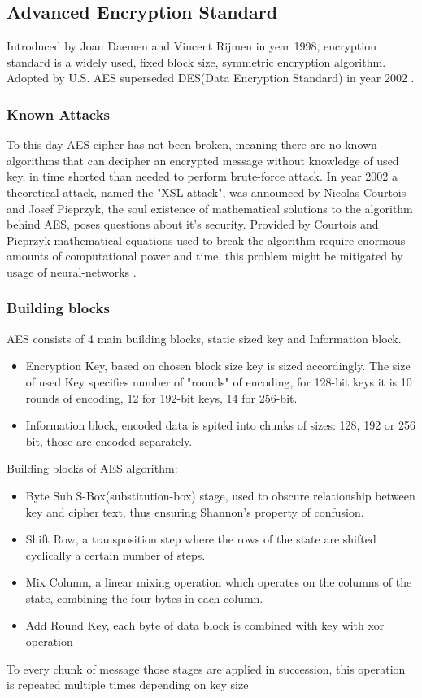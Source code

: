 \documentclass{article}
\begin{document}
\subsection{Advanced Encryption Standard}

Introduced by Joan Daemen and Vincent Rijmen in year 1998, encryption standard is a widely used, fixed block size, symmetric encryption algorithm. Adopted by U.S. AES superseded DES(Data Encryption Standard) in year 2002 \cite{Cryptanalysis of Block Ciphers}.

\subsubsection{Known Attacks}
To this day AES cipher has not been broken, meaning there are no known algorithms that can decipher an encrypted message without knowledge of used key, in time shorted than needed to perform brute-force attack.
In year 2002 a theoretical attack, named the "XSL attack", was announced by Nicolas Courtois and Josef Pieprzyk, the soul existence of mathematical solutions to the algorithm behind AES, poses questions about it's security. Provided by Courtois and Pieprzyk mathematical equations used to break the algorithm require enormous amounts of computational power and time, this problem might be mitigated by usage of neural-networks \cite{Cryptanalysis of Block Ciphers}.

\subsubsection{Building blocks}
AES consists of 4 main building blocks, static sized key and Information block. 

\begin{itemize}
\item Encryption Key, based on chosen block size key is sized accordingly. The size of used Key specifies number of "rounds" of encoding, for 128-bit keys it is 10 rounds of encoding, 12 for 192-bit keys, 14 for 256-bit. 
\item Information block, encoded data is spited into chunks of sizes: 128, 192 or 256 bit, those are encoded separately.  
\end{itemize}
Building blocks of AES algorithm:
\begin{itemize}
\item Byte Sub
S-Box(substitution-box) stage, used to obscure relationship between key and cipher text, thus ensuring Shannon's property of confusion.
\item Shift Row, a transposition step where the rows of the state are shifted cyclically a certain number of steps.
\item Mix Column, a linear mixing operation which operates on the columns of the state, combining the four bytes in each column.
\item Add Round Key, each byte of data block is combined with key with xor operation 
\end{itemize}
 To every chunk of message those stages are applied in succession, this operation is repeated multiple times depending on key size
\end{document}
